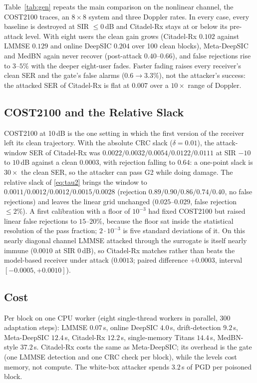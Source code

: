 \documentclass[journal]{IEEEtran}
\begin{document}
Table~\ref{tab:gen} repeats the main comparison on the nonlinear channel, the COST2100
traces, an $8\times8$ system and three Doppler rates. In every case, every baseline is
destroyed at SIR $\le0$\,dB and Citadel-Rx stays at or below its pre-attack level. With
eight users the clean gain grows (Citadel-Rx $0.102$ against LMMSE $0.129$ and online
DeepSIC $0.204$ over 100 clean blocks), Meta-DeepSIC and MedBN again never recover
(post-attack $0.40$--$0.66$), and false rejections rise to $3$--$5\%$ with the deeper
eight-user fades. Faster fading raises every receiver's clean SER and the gate's false
alarms ($0.6\to3.3\%$), not the attacker's success: the attacked SER of Citadel-Rx is
flat at $0.007$ over a $10\times$ range of Doppler.

\subsection{COST2100 and the Relative Slack}\label{sec:cost2100}
COST2100 at 10\,dB is the one setting in which the first version of the receiver left
its clean trajectory. With the absolute CRC slack ($\delta=0.01$), the attack-window SER
of Citadel-Rx was $0.0022/0.0032/0.0054/0.0122/0.0111$ at SIR $-10$ to $10$\,dB against a
clean $0.0003$, with rejection falling to $0.64$: a one-point slack is $30\times$ the clean
SER, so the attacker can pass G2 while doing damage. The relative slack of
\eqref{eq:tau2} brings the window to $0.0011/0.0012/0.0012/0.0015/0.0028$ (rejection
$0.89/0.90/0.86/0.74/0.40$, no false rejections) and leaves the linear grid unchanged
($0.025$--$0.029$, false rejection $\le2\%$). A first calibration with a floor of $10^{-3}$
had fixed COST2100 but raised linear false rejections to $15$--$20\%$, because the floor
sat inside the statistical resolution of the pass fraction; $2\cdot10^{-3}$ is five
standard deviations of it. On this nearly diagonal channel LMMSE attacked through the
surrogate is itself nearly immune ($0.0010$ at SIR 0\,dB), so Citadel-Rx matches rather
than beats the model-based receiver under attack ($0.0013$; paired difference $+0.0003$,
interval $[-0.0005,+0.0010]$).

\subsection{Cost}
Per block on one CPU worker (eight single-thread workers in parallel, 300 adaptation
steps): LMMSE $0.07$\,s, online DeepSIC $4.0$\,s, drift-detection $9.2$\,s, Meta-DeepSIC
$12.4$\,s, Citadel-Rx $12.2$\,s, single-memory Titans $14.4$\,s, MedBN-style $37.2$\,s.
Citadel-Rx costs the same as Meta-DeepSIC; its overhead is the gate (one LMMSE detection
and one CRC check per block), while the levels cost memory, not compute. The white-box
attacker spends $3.2$\,s of PGD per poisoned block.
\end{document}
